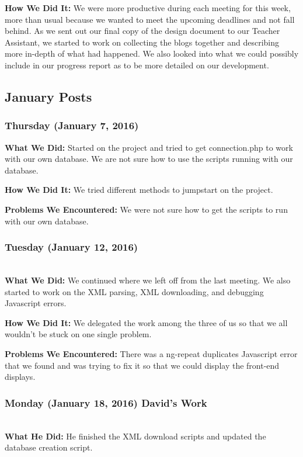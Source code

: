\documentclass[onecolumn]{IEEEtran}
\begin{document}
    \textbf{How We Did It: } 
    We were more productive during each meeting for this week, more than usual because we wanted to meet the upcoming deadlines and not fall behind. As we sent out our final copy of the design document to our Teacher Assistant, we started to work on collecting the blogs together and describing more in-depth of what had happened. We also looked into what we could possibly include in our progress report as to be more detailed on our development.  

\subsection{January Posts}
\subsubsection{Thursday (January 7, 2016)  }
    \textbf{What We Did: }
    Started on the project and tried to get connection.php to work with our own database. We are not sure how to use the scripts running with our database.  
    
    \textbf{How We Did It: } 
    We tried different methods to jumpstart on the project.  
    
    \textbf{Problems We Encountered: } 
    We were not sure how to get the scripts to run with our own database.  

\subsubsection{Tuesday (January 12, 2016)} \hspace*{\fill} \\
    \textbf{What We Did: }
    We continued where we left off from the last meeting. We also started to work on the XML parsing, XML downloading, and debugging Javascript errors.  
    
    \textbf{How We Did It: } 
    We delegated the work among the three of us so that we all wouldn't be stuck on one single problem.  
    
    \textbf{Problems We Encountered: } 
    There was a ng-repeat duplicates Javascript error that we found and was trying to fix it so that we could display the front-end displays.    

\subsubsection{Monday (January 18, 2016) David's Work  } \hspace*{\fill} \\
    \textbf{What He Did: } 
    He finished the XML download scripts and updated the database creation script.  
    
\end{document}

